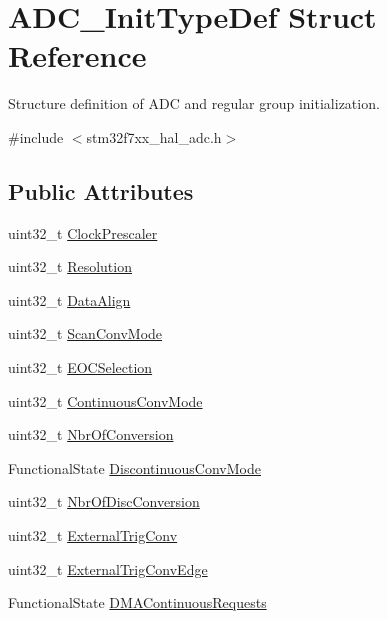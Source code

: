 \hypertarget{struct_a_d_c___init_type_def}{}\section{A\+D\+C\+\_\+\+Init\+Type\+Def Struct Reference}
\label{struct_a_d_c___init_type_def}


Structure definition of A\+DC and regular group initialization.  




{\ttfamily \#include $<$stm32f7xx\+\_\+hal\+\_\+adc.\+h$>$}

\subsection*{Public Attributes}
\begin{DoxyCompactItemize}
\item 
uint32\+\_\+t \mbox{\hyperlink{struct_a_d_c___init_type_def_a7e49d0db9ef7db8806bbfa57a1bd73a6}{Clock\+Prescaler}}
\item 
uint32\+\_\+t \mbox{\hyperlink{struct_a_d_c___init_type_def_abebb8d3277cb9a5aae72578076762f5d}{Resolution}}
\item 
uint32\+\_\+t \mbox{\hyperlink{struct_a_d_c___init_type_def_af9ec9040d55aa68c23d92d174b464ac1}{Data\+Align}}
\item 
uint32\+\_\+t \mbox{\hyperlink{struct_a_d_c___init_type_def_a47cd689a52562a2481059a5d8ed82788}{Scan\+Conv\+Mode}}
\item 
uint32\+\_\+t \mbox{\hyperlink{struct_a_d_c___init_type_def_ae3eedd269c3acc6c6933e8a252c36e71}{E\+O\+C\+Selection}}
\item 
uint32\+\_\+t \mbox{\hyperlink{struct_a_d_c___init_type_def_a4bf957b8be6ae85d71e9376e6f1e633b}{Continuous\+Conv\+Mode}}
\item 
uint32\+\_\+t \mbox{\hyperlink{struct_a_d_c___init_type_def_aa72b0cc3e8dac3a30097cf12093c42a7}{Nbr\+Of\+Conversion}}
\item 
Functional\+State \mbox{\hyperlink{struct_a_d_c___init_type_def_afb62fa7128d7c97d53d2eb170ad467eb}{Discontinuous\+Conv\+Mode}}
\item 
uint32\+\_\+t \mbox{\hyperlink{struct_a_d_c___init_type_def_a5c0078be814bfe2608ae5758826eafb8}{Nbr\+Of\+Disc\+Conversion}}
\item 
uint32\+\_\+t \mbox{\hyperlink{struct_a_d_c___init_type_def_a47aba277f9d8f3c5774983de4ce9455b}{External\+Trig\+Conv}}
\item 
uint32\+\_\+t \mbox{\hyperlink{struct_a_d_c___init_type_def_aeed14631d5f1d118a252ea24edd68ede}{External\+Trig\+Conv\+Edge}}
\item 
Functional\+State \mbox{\hyperlink{struct_a_d_c___init_type_def_a2c35c52d6f47c62915fa7d011e526510}{D\+M\+A\+Continuous\+Requests}}
\end{DoxyCompactItemize}


